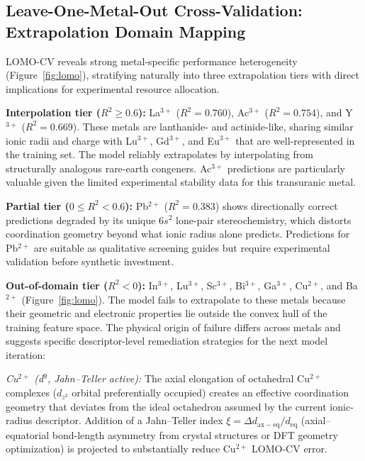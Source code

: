 \documentclass[journal=jacsat,manuscript=article]{achemso}
\begin{document}
\subsection{Leave-One-Metal-Out Cross-Validation: Extrapolation Domain Mapping}

LOMO-CV reveals strong metal-specific performance heterogeneity (Figure~\ref{fig:lomo}),
stratifying naturally into three extrapolation tiers with direct implications for
experimental resource allocation.

\textbf{Interpolation tier ($R^2 \geq 0.6$):}
La$^{3+}$ ($R^2 = 0.760$), Ac$^{3+}$ ($R^2 = 0.754$), and Y$^{3+}$ ($R^2 = 0.669$).
These metals are lanthanide- and actinide-like, sharing similar ionic radii and charge
with Lu$^{3+}$, Gd$^{3+}$, and Eu$^{3+}$ that are well-represented in the training set.
The model reliably extrapolates by interpolating from structurally analogous
rare-earth congeners.\cite{RocaSabio2009,Thiele2017,Ballal2020}
Ac$^{3+}$ predictions are particularly valuable given the limited experimental
stability data for this transuranic metal.\cite{Thiele2017,Ballal2020}

\textbf{Partial tier ($0 \leq R^2 < 0.6$):}
Pb$^{2+}$ ($R^2 = 0.383$) shows directionally correct predictions degraded by its
unique $6s^2$ lone-pair stereochemistry, which distorts coordination geometry beyond
what ionic radius alone predicts.\cite{FerrandoCliment2022,Blei2023}
Predictions for Pb$^{2+}$ are suitable as qualitative screening guides but require
experimental validation before synthetic investment.

\textbf{Out-of-domain tier ($R^2 < 0$):}
In$^{3+}$, Lu$^{3+}$, Sc$^{3+}$, Bi$^{3+}$, Ga$^{3+}$, Cu$^{2+}$, and Ba$^{2+}$
(Figure~\ref{fig:lomo}).
The model fails to extrapolate to these metals because their geometric and
electronic properties lie outside the convex hull of the training feature space.
The physical origin of failure differs across metals and suggests specific
descriptor-level remediation strategies for the next model iteration:

\textit{Cu$^{2+}$ (d$^9$, Jahn--Teller active):}
The axial elongation of octahedral Cu$^{2+}$ complexes ($d_{z^2}$ orbital
preferentially occupied) creates an effective coordination geometry that deviates
from the ideal octahedron assumed by the current ionic-radius descriptor.
Addition of a Jahn--Teller index $\xi = \Delta d_\mathrm{ax-eq} / d_\mathrm{eq}$
(axial--equatorial bond-length asymmetry from crystal structures or DFT geometry
optimization) is projected to substantially reduce Cu$^{2+}$ LOMO-CV error.
\cite{Notni2010,Wadas2010}
\end{document}
